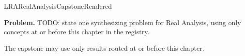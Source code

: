 \ifcsname LRARealAnalysisCapstoneRendered\endcsname
\else
\expandafter\gdef\csname LRARealAnalysisCapstoneRendered\endcsname{}

\newpage
{}
\label{cap:real-analysis}

\begin{tcolorbox}[
  colback=gray!6,
  colframe=gray!40,
  arc=2pt,
  left=8pt, right=8pt, top=6pt, bottom=6pt,
  title={\small\textbf{Capstone Problem}},
  fonttitle=\small\bfseries
]
\textbf{Problem.}
TODO: state one synthesizing problem for Real Analysis, using only concepts at or
before this chapter in the registry.
\end{tcolorbox}

\begin{remark*}
The capstone may use only results routed at or before this chapter.
\end{remark*}

\clearpage
\fi
